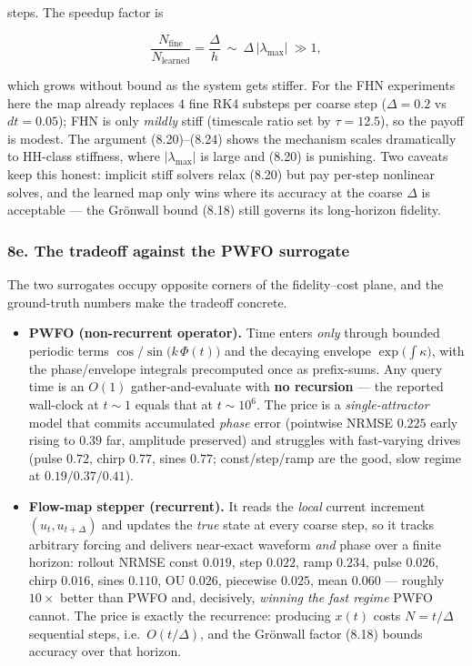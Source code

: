 \documentclass[
  11pt,
]{article}
\begin{document}
steps. The speedup factor is

\[
\frac{N_{\text{fine}}}{N_{\text{learned}}}=\frac{\Delta}{h}\ \sim\ \Delta\,|\lambda_{\max}|\ \gg 1,
\tag{8.24}
\]

which grows without bound as the system gets stiffer. For the FHN
experiments here the map already replaces \(4\) fine RK4 substeps per
coarse step (\(\Delta=0.2\) vs \(dt=0.05\)); FHN is only \emph{mildly}
stiff (timescale ratio set by \(\tau=12.5\)), so the payoff is modest.
The argument (8.20)--(8.24) shows the mechanism scales dramatically to
HH-class stiffness, where \(|\lambda_{\max}|\) is large and (8.20) is
punishing. Two caveats keep this honest: implicit stiff solvers relax
(8.20) but pay per-step nonlinear solves, and the learned map only wins
where its accuracy at the coarse \(\Delta\) is acceptable --- the
Grönwall bound (8.18) still governs its long-horizon fidelity.

\subsubsection{8e. The tradeoff against the PWFO
surrogate}\label{e.-the-tradeoff-against-the-pwfo-surrogate}

The two surrogates occupy opposite corners of the fidelity--cost plane,
and the ground-truth numbers make the tradeoff concrete.

\begin{itemize}
\item
  \textbf{PWFO (non-recurrent operator).} Time enters \emph{only}
  through bounded periodic terms \(\cos/\sin\!\big(k\,\Phi(t)\big)\) and
  the decaying envelope \(\exp\!\big(\int\kappa\big)\), with the
  phase/envelope integrals precomputed once as prefix-sums. Any query
  time is an \(O(1)\) gather-and-evaluate with \textbf{no recursion} ---
  the reported wall-clock at \(t\!\sim\!1\) equals that at
  \(t\!\sim\!10^{6}\). The price is a \emph{single-attractor} model that
  commits accumulated \emph{phase} error (pointwise NRMSE \(0.225\)
  early rising to \(0.39\) far, amplitude preserved) and struggles with
  fast-varying drives (pulse \(0.72\), chirp \(0.77\), sines \(0.77\);
  const/step/ramp are the good, slow regime at \(0.19/0.37/0.41\)).
\item
  \textbf{Flow-map stepper (recurrent).} It reads the \emph{local}
  current increment \((u_{t},u_{t+\Delta})\) and updates the \emph{true}
  state at every coarse step, so it tracks arbitrary forcing and
  delivers near-exact waveform \emph{and} phase over a finite horizon:
  rollout NRMSE const \(0.019\), step \(0.022\), ramp \(0.234\), pulse
  \(0.026\), chirp \(0.016\), sines \(0.110\), OU \(0.026\), piecewise
  \(0.025\), mean \(0.060\) --- roughly \(10\times\) better than PWFO
  and, decisively, \emph{winning the fast regime} PWFO cannot. The price
  is exactly the recurrence: producing \(x(t)\) costs \(N=t/\Delta\)
  sequential steps, i.e.~\(O(t/\Delta)\), and the Grönwall factor (8.18)
  bounds accuracy over that horizon.
\end{itemize}
\end{document}
